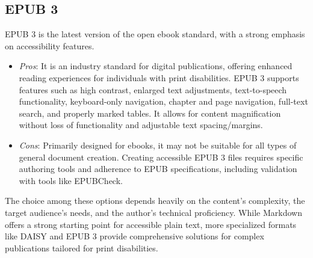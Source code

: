 \subsection{EPUB 3}
EPUB 3 is the latest version of the open ebook standard, with a strong emphasis on accessibility features. \supercite{ElsevierEPUB3, CNIBEPUB}
\begin{itemize}
	\item \emph{Pros}: It is an industry standard for digital publications, offering enhanced reading experiences for individuals with print disabilities. \supercite{ElsevierEPUB3} EPUB 3 supports features such as high contrast, enlarged text adjustments, text-to-speech functionality, keyboard-only navigation, chapter and page navigation, full-text search, and properly marked tables. \supercite{ElsevierEPUB3} It allows for content magnification without loss of functionality and adjustable text spacing/margins. \supercite{ElsevierEPUB3}
	\item \emph{Cons}: Primarily designed for ebooks, it may not be suitable for all types of general document creation. Creating accessible EPUB 3 files requires specific authoring tools and adherence to EPUB specifications, including validation with tools like EPUBCheck. \supercite{CNIBEPUB}
\end{itemize}
The choice among these options depends heavily on the content's complexity, the target audience's needs, and the author's technical proficiency. While Markdown offers a strong starting point for accessible plain text, more specialized formats like DAISY and EPUB 3 provide comprehensive solutions for complex publications tailored for print disabilities.

